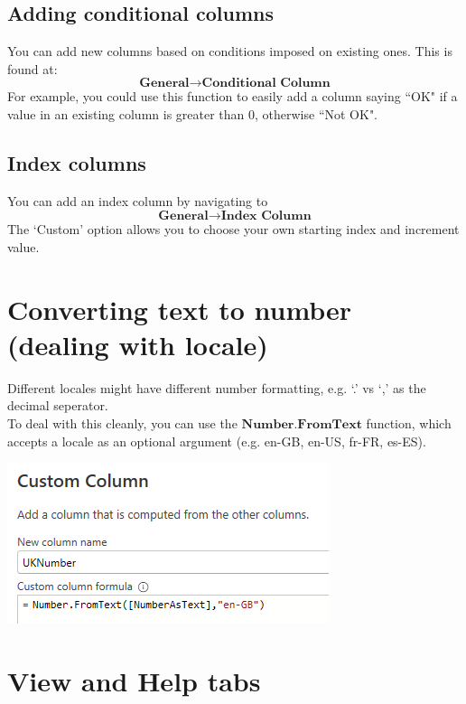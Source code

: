 \documentclass[10pt, openany, twocolumn]{book}
\begin{document}
\subsection*{Adding conditional columns}

You can add new columns based on conditions imposed on existing ones. This is found at:
$$\textbf{General} \rightarrow \textbf{Conditional Column}$$
For example, you could use this function to easily add a column saying ``OK" if a value in an existing column is greater than 0, otherwise ``Not OK". 

\subsection*{Index columns}

You can add an index column by navigating to 
$$\textbf{General}
\rightarrow \textbf{Index Column}$$
The `Custom' option allows you to choose your own starting index and increment value.

\section{Converting text to number (dealing with locale)}

Different locales might have different number formatting, e.g. `.' vs `,' as the decimal seperator.\\

To deal with this cleanly, you can use the $\textbf{Number.FromText}$ function, which accepts a locale as an optional argument (e.g. en-GB, en-US, fr-FR, es-ES).

\begin{center}
    \includegraphics[width = 0.9\columnwidth]{images/NumberFromText.png}
\end{center}

\section{View and Help tabs}
\end{document}
